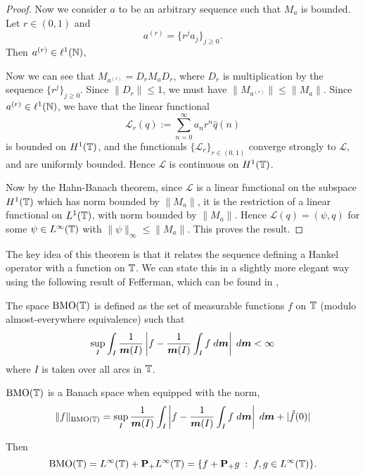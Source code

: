 \begin{proof}
    Now we consider $a$ to be an arbitrary sequence such that $M_a$ is bounded. Let $r \in (0,1)$
    and
    \begin{equation*}
        a^{(r)} = \{r^ja_j\}_{j\geq 0}.
    \end{equation*}
    Then $a^{(r)} \in \ell^1(\mathbb{N})$,
    
    Now we can see that $M_{a^{(r)}} = D_r M_a D_r$, where $D_r$
    is multiplication by the sequence $\{r^j\}_{j\geq 0}$. Since $\|D_r\| \leq 1$, 
    we must have $\|M_{a^{(r)}}\| \leq \|M_a\|$. Since $a^{(r)} \in \ell^1(\mathbb{N})$, 
    we have that the linear functional
    \begin{equation*}
        \mathcal{L}_r(q) := \sum_{n=0}^\infty a_nr^n \hat{q}(n)
    \end{equation*}
    is bounded on $H^1(\mathbb{T})$, and the functionals $\{\mathcal{L}_r\}_{r \in (0,1)}$
    converge strongly to $\mathcal{L}$, and are uniformly bounded. Hence $\mathcal{L}$
    is continuous on $H^1(\mathbb{T})$. 
    
    Now by the Hahn-Banach theorem, since $\mathcal{L}$ is a linear
    functional on the subspace $H^1(\mathbb{T})$ which has norm bounded
    by $\|M_a\|$, it is the restriction
    of a linear functional on $L^1(\mathbb{T})$, with norm bounded by $\|M_a\|$.
    Hence $\mathcal{L}(q) = (\psi,q)$ for some $\psi \in L^\infty(\mathbb{T})$
    with $\|\psi\|_\infty \leq \|M_a\|$. This proves the result.    
\end{proof}

The key idea of this theorem is that it relates the sequence defining
a Hankel operator with a function on $\mathbb{T}$. We can state this in a slightly more
elegant way using the following result of Fefferman, which can be found in \cite{Garnett},
\begin{proposition}
    The space $\operatorname{BMO}(\mathbb{T})$ is defined as the set of measurable
    functions $f$ on $\mathbb{T}$ (modulo almost-everywhere equivalence) such that
    \begin{equation*}
        \sup_I \int_I \frac{1}{\boldsymbol{m}(I)}\left|f-\frac{1}{\boldsymbol{m}(I)}\int_I f\;d\boldsymbol{m}\right|\;d\boldsymbol{m} < \infty
    \end{equation*}
    where $I$ is taken over all arcs in $\mathbb{T}$.
    
    $\operatorname{BMO}(\mathbb{T})$ is a Banach space when equipped with the norm,
    \begin{equation*}
        \|f\|_{\operatorname{BMO}(\mathbb{T})} = \sup_I \frac{1}{\boldsymbol{m}(I)}\int_I \left|f-\frac{1}{\boldsymbol{m}(I)}\int_I f\;d\boldsymbol{m}\right|\;d\boldsymbol{m} + |\hat{f}(0)|
    \end{equation*}
    
    Then 
    \begin{equation*}
        \operatorname{BMO}(\mathbb{T}) = L^\infty(\mathbb{T})+\mathbf{P}_+L^\infty(\mathbb{T}) = \{f+\mathbf{P}_+g\;:\;f,g \in L^\infty(\mathbb{T})\}.
    \end{equation*}
\end{proposition}

